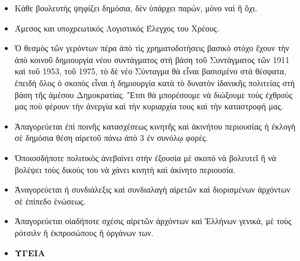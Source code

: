 \documentclass[a4paper]{article}
\begin{document}
\begin{itemize}
\item Κάθε βουλευτὴς ψηφίζει δημόσια, δὲν ὑπάρχει παρών, μόνο ναὶ ἢ ὄχι.
\item Άμεσος και υποχρεωτικός Λογιστικός Έλεγχος του Χρέους.
\item Ὁ θεσμὸς τῶν γερόντων πέρα ἀπὸ τὶς χρηματοδοτήσεις βασικὸ στόχο ἔχουν τὴν ἀπὸ κοινοῦ δημιουργία νέου συντάγματος στὴ βάση τοῦ Συντάγματος τῶν 1911 καὶ τοῦ 1953, τοῦ 1975, τὸ δὲ νέο Σύνταγμα θὰ εἶναι βασισμένο στὰ θέσφατα, ἐπειδὴ ὅλος ὁ σκοπὸς εἶναι ἡ δημιουργία κατὰ τὸ δυνατὸν ἰδανικῆς πολιτείας στὴ βάση τῆς ἀμέσου Δημοκρατίας. Ἔτσι θὰ μπορέσουμε νὰ διώξουμε τοὺς ἐχθρούς μας ποὺ φέρουν τὴν ἀνεργία καὶ τὴν κυριαρχία τους καὶ τὴν καταστροφή μας.
\item Ἀπαγορεύεται ἐπὶ ποινῆς κατασχέσεως κινητῆς καὶ ἀκινήτου περιουσίας ἡ ἐκλογὴ σὲ δημόσια θέση αἱρετοῦ πάνω ἀπὸ 3 ἐν συνόλῳ φορές.
\item Ὁποιοσδήποτε πολιτικὸς ἀνεβαίνει στὴν ἐξουσία μὲ σκοπὸ νὰ βολευτεῖ ἢ νὰ βολέψει τοὺς δικούς του νὰ χάνει κινητὴ καὶ ἀκίνητο περιουσία.
\item Ἀναγορεύεται ἡ συνδιάλεξις καὶ συνδιαλαγὴ αἱρετῶν καὶ διορισμένων ἀρχόντων σὲ ἐπίπεδο ἑνώσεως.
\item Ἀπαγορεύεται οἱαδήποτε σχέσις αἱρετῶν ἀρχόντων καὶ Ἑλλήνων γενικά, μὲ τοὺς ρότσιλν ἢ ἐκπροσώπους ἢ ὀργάνων των.

\item  \textbf{ΥΓΕΙΑ}


\end{itemize}
\end{document}
